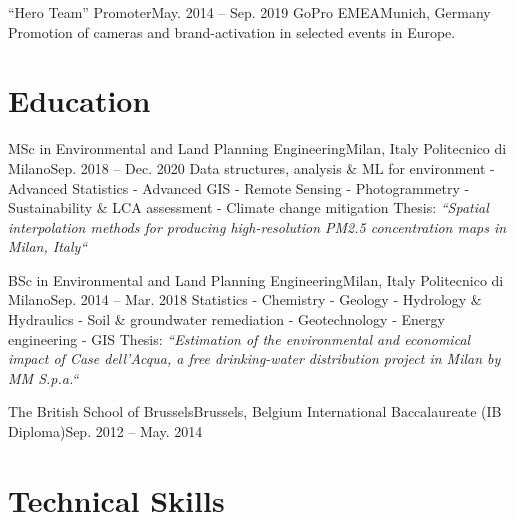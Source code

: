 \documentclass[letterpaper,11pt]{article}
\begin{document}
\subHeading
{“Hero Team” Promoter}{May. 2014 -- Sep. 2019}
{GoPro EMEA}{Munich, Germany}
{Promotion of cameras and brand-activation in selected events in Europe.}

\subHeadingListEnd


\section{Education}
\subHeadingListStart

\subHeading
{MSc in Environmental and Land Planning Engineering}{Milan, Italy}
{Politecnico di Milano}{Sep. 2018 -- Dec. 2020}
{\scriptsize Data structures, analysis \& ML for environment - Advanced Statistics - Advanced GIS -
  Remote Sensing - Photogrammetry -
  Sustainability \& LCA assessment - Climate change mitigation\newline
  {\scriptsize Thesis: \it “Spatial interpolation methods for producing high-resolution PM2.5
    concentration maps in Milan, Italy“}}

\subHeading
{BSc in Environmental and Land Planning Engineering}{Milan, Italy}
{Politecnico di Milano}{Sep. 2014 -- Mar. 2018}
{\scriptsize Statistics - Chemistry - Geology - Hydrology \& Hydraulics
  - Soil \& groundwater remediation - Geotechnology - Energy engineering - GIS\newline
  {\scriptsize Thesis: \it “Estimation of the environmental and economical impact of Case dell'Acqua,
    a free drinking-water distribution project in Milan by MM S.p.a.“}}

\subHeading
{The British School of Brussels}{Brussels, Belgium}
{International Baccalaureate (IB Diploma)}{Sep. 2012 -- May. 2014}{}
\subHeadingListEnd

\section{Technical Skills}
\skillsMulticolListStart
\skillsMulticolListEnd
\end{document}
